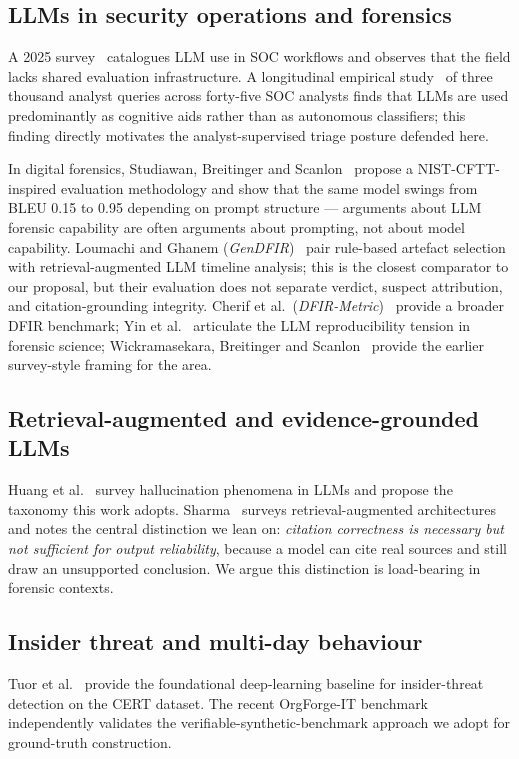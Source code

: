 \documentclass[conference]{IEEEtran}
\begin{document}
\subsection{LLMs in security operations and forensics}
A 2025 survey~\cite{ref3} catalogues LLM use in SOC workflows and observes that the field lacks shared evaluation infrastructure. A longitudinal empirical study~\cite{ref4} of three thousand analyst queries across forty-five SOC analysts finds that LLMs are used predominantly as cognitive aids rather than as autonomous classifiers; this finding directly motivates the analyst-supervised triage posture defended here.

In digital forensics, Studiawan, Breitinger and Scanlon~\cite{ref5} propose a NIST-CFTT-inspired evaluation methodology and show that the same model swings from BLEU 0.15 to 0.95 depending on prompt structure --- arguments about LLM forensic capability are often arguments about prompting, not about model capability. Loumachi and Ghanem (\textit{GenDFIR})~\cite{ref6} pair rule-based artefact selection with retrieval-augmented LLM timeline analysis; this is the closest comparator to our proposal, but their evaluation does not separate verdict, suspect attribution, and citation-grounding integrity. Cherif et al.~(\textit{DFIR-Metric})~\cite{ref7} provide a broader DFIR benchmark; Yin et al.~\cite{ref8} articulate the LLM reproducibility tension in forensic science; Wickramasekara, Breitinger and Scanlon~\cite{ref9} provide the earlier survey-style framing for the area.

\subsection{Retrieval-augmented and evidence-grounded LLMs}
Huang et al.~\cite{ref10} survey hallucination phenomena in LLMs and propose the taxonomy this work adopts. Sharma~\cite{ref11} surveys retrieval-augmented architectures and notes the central distinction we lean on: \textit{citation correctness is necessary but not sufficient for output reliability}, because a model can cite real sources and still draw an unsupported conclusion. We argue this distinction is load-bearing in forensic contexts.

\subsection{Insider threat and multi-day behaviour}
Tuor et al.~\cite{ref12} provide the foundational deep-learning baseline for insider-threat detection on the CERT dataset. The recent OrgForge-IT benchmark~\cite{ref13} independently validates the verifiable-synthetic-benchmark approach we adopt for ground-truth construction.
\end{document}
